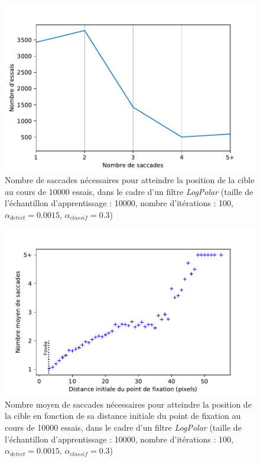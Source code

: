 \begin{figure}[th]
\centering
\includegraphics{Figures/logpolar_sacc_nombre}
\decoRule
\caption[Figure]{Nombre de saccades nécessaires pour atteindre la position de la cible au cours de 10000 essais, dans le cadre d'un filtre \textit{LogPolar} (taille de l'échantillon d'apprentissage :  10000, nombre d'itérations : 100, $\alpha_{detect}=0.0015$, $\alpha_{classif}=0.3$)}
\label{fig:sacc_nombre}
\end{figure}

\begin{figure}[th]
\centering
\includegraphics{Figures/logpolar_sacc_distance}
\decoRule
\caption[Figure]{Nombre moyen de saccades nécessaires pour atteindre la position de la cible en fonction de sa distance initiale du point de fixation au cours de 10000 essais, dans le cadre d'un filtre \textit{LogPolar} (taille de l'échantillon d'apprentissage :  10000, nombre d'itérations : 100, $\alpha_{detect}=0.0015$, $\alpha_{classif}=0.3$)}
\label{fig:sacc_distance}
\end{figure}

